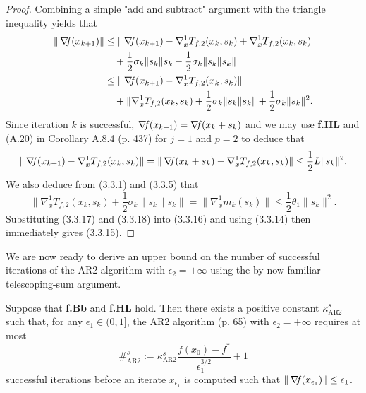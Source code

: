 \documentclass[10pt,a4paper]{article}
\begin{document}
\begin{proof}Combining a simple "add and subtract" argument with the triangle inequality yields that
\begin{align*}
	\|\operatorname*{\mathit{\nabla \!f}}(x_{k+1})\| &\leq \|\operatorname*{\mathit{\nabla \!f}}(x_{k+1}) - \nabla_x^1 T_{f,2}(x_k, s_k) + \nabla_x^1 T_{f,2}(x_k, s_k) \\
	&\quad + \frac{1}{2}\sigma_k \|s_k\| s_k - \frac{1}{2}\sigma_k \|s_k\| s_k\| \\
	&\leq \|\operatorname*{\mathit{\nabla \!f}}(x_{k+1}) - \nabla_x^1 T_{f,2}(x_k, s_k)\| \\
	&\quad + \|\nabla_x^1 T_{f,2}(x_k, s_k) + \frac{1}{2}\sigma_k \|s_k\| s_k\| + \frac{1}{2}\sigma_k \|s_k\|^2.
\end{align*}
Since iteration $k$ is successful, $\operatorname*{\mathit{\nabla \!f}}(x_{k+1}) = \operatorname*{\mathit{\nabla \!f}}(x_k + s_k)$ and we may use \textbf{f.HL} and (A.20) in Corollary A.8.4 (p. 437) for $j = 1$ and $p = 2$ to deduce that
\begin{equation*}
	\|\operatorname*{\mathit{\nabla \!f}}(x_{k+1}) - \nabla_x^1 T_{f,2}(x_k, s_k)\| = \|\operatorname*{\mathit{\nabla \!f}}(x_k + s_k) - \nabla_x^1 T_{f,2}(x_k, s_k)\| \leq \frac{1}{2}L\|s_k\|^2.
\end{equation*}
We also deduce from (3.3.1) and (3.3.5) that
\begin{equation*}
	\|\nabla_x^1 T_{f,2}(x_k, s_k) + \frac{1}{2}\sigma_k \|s_k\| s_k\| = \|\nabla_x^1 m_k(s_k)\| \leq \frac{1}{2}\theta_1 \|s_k\|^2.
\end{equation*}
Substituting (3.3.17) and (3.3.18) into (3.3.16) and using (3.3.14) then immediately gives (3.3.15). 
\end{proof}

We are now ready to derive an upper bound on the number of successful iterations of the AR2 algorithm with $\epsilon_2 = +\infty$ using the by now familiar telescoping-sum argument.

\begin{lemma}
	Suppose that \textbf{f.Bb} and \textbf{f.HL} hold. Then there exists a positive constant $\kappa_{\text{AR2}}^s$ such that, for any $\epsilon_1 \in (0, 1]$, the AR2 algorithm (p. 65) with $\epsilon_2 = +\infty$ requires at most
	\begin{equation*}
		\#_{\text{AR2}}^s := \kappa_{\text{AR2}}^s \frac{f(x_0) - f^*}{\epsilon_1^{3/2}} + 1
	\end{equation*}
	successful iterations before an iterate $x_{\epsilon_1}$ is computed such that $\|\operatorname*{\mathit{\nabla \!f}}(x_{\epsilon_1})\| \leq \epsilon_1$.
\end{lemma}
\end{document}
